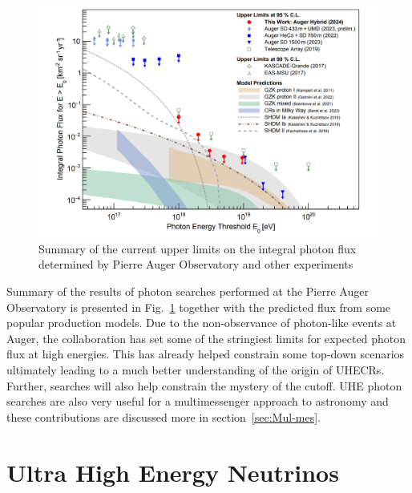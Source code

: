 \begin{figure}[t!]
  \centering
  \includegraphics[width=14.5cm]{thesis_figures/CRnNu/Photon-limits.png}
  \caption{Summary of the current upper limits on the integral photon flux determined by Pierre Auger Observatory and other experiments~\cite{PierreAuger:2024ayl}}
  \label{fig:Auger-Photon-limits}
\end{figure}

Summary of the results of photon searches performed at the Pierre Auger Observatory is presented in Fig.~\ref{fig:Auger-Photon-limits} together with the predicted flux from some popular production models. Due to the non-observance of photon-like events at Auger, the collaboration has set some of the stringiest limits for expected photon flux at high energies. This has already helped constrain some top-down scenarios ultimately leading to a much better understanding of the origin of \glspl{UHECR}. Further, searches will also help constrain the mystery of the cutoff. UHE photon searches are also very useful for a multimessenger approach to astronomy and these contributions are discussed more in section~\ref{sec:Mul-mes}.


\section{Ultra High Energy Neutrinos}
\label{sec:UHENu}
